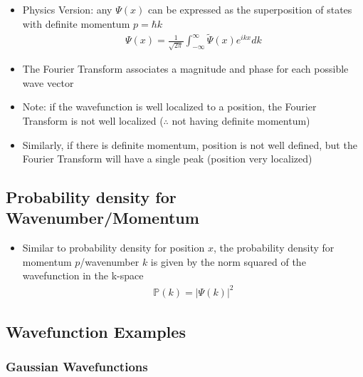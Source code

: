 \documentclass[a4paper,12pt]{article}
\begin{document}
\begin{itemize}
  \item Physics Version: any $\Psi(x)$ can be expressed as the superposition of states with definite momentum $p = \hbar k$
  \begin{align}
    \Psi(x) = \frac{1}{\sqrt{2\pi}} \int^{\infty}_{-\infty}\widetilde{\Psi}(x) e^{ikx} dk
  \end{align}
  \item The Fourier Transform associates a magnitude and phase for each possible wave vector
  \item Note: if the wavefunction is well localized to a position, the Fourier Transform is not well localized ($\therefore$ not having definite momentum)
  \item Similarly, if there is definite momentum, position is not well defined, but the Fourier Transform will have a single peak (position very localized)

\end{itemize}

\subsection{Probability density for Wavenumber/Momentum}

\begin{itemize}
  \item Similar to probability density for position $x$, the probability density for momentum $p$/wavenumber $k$ is given by the norm squared of the wavefunction in the k-space
  \begin{align}
    \mathbb{P}(k) = |\Psi(k)|^2
  \end{align}
\end{itemize}



\subsection{Wavefunction Examples}

\subsubsection{Gaussian Wavefunctions}
\end{document}
